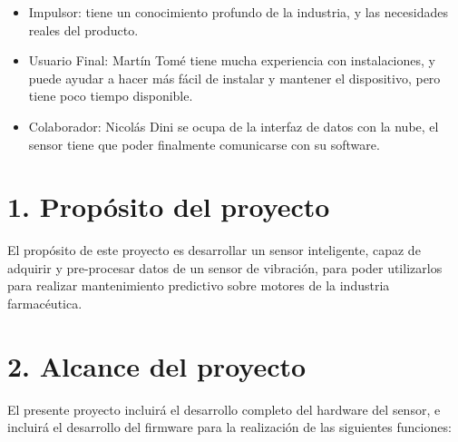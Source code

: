 \documentclass[11pt]{charter}
\begin{document}
\begin{itemize}
\item Impulsor: \clientename tiene un conocimiento profundo de la industria, y las necesidades reales del producto.
\item Usuario Final: Martín Tomé tiene mucha experiencia con instalaciones, y puede ayudar a hacer más fácil de instalar y mantener el dispositivo, pero tiene poco tiempo disponible.
\item Colaborador: Nicolás Dini se ocupa de la interfaz de datos con la nube, el sensor tiene que poder finalmente comunicarse con su software.
\end{itemize}




\section{1. Propósito del proyecto}
\label{sec:proposito}

El propósito de este proyecto es desarrollar un sensor inteligente, capaz de adquirir y pre-procesar datos de un sensor de vibración, para poder utilizarlos para realizar mantenimiento predictivo sobre motores de la industria farmacéutica.

\section{2. Alcance del proyecto}
\label{sec:alcance}

%
%
%
%

El presente proyecto incluirá el desarrollo completo del hardware del sensor, e incluirá el desarrollo del firmware para la realización de las siguientes funciones:
\end{document}
